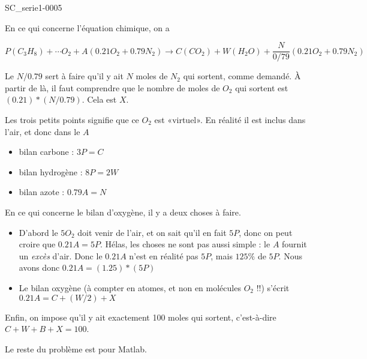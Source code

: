 \begin{corrige}{SC_serie1-0005}

	En ce qui concerne l'équation chimique, on a

	\begin{equation}
		P(C_3H_8) + \cdots O_2 + A(0.21 O_2 + 0.79 N_2) \to C (CO_2) + W(H_2O) + \frac{ N }{ 0/79 } (0.21 O_2 + 0.79 N_2)
	\end{equation}

Le $N/0.79$ sert à faire qu'il y ait $N$ moles de $N_2$ qui sortent, comme demandé. À partir de là, il faut comprendre que le nombre de moles de $O_2$ qui sortent est $(0.21)*(N/0.79)$. Cela est $X$.

 Les trois petits points signifie que ce $O_2$ est «virtuel». En réalité il est inclus dans l'air, et donc dans le $A$

\begin{itemize}
	\item 
bilan carbone : $3P = C$
\item
 bilan hydrogène : $8P = 2W$
 \item
 bilan azote : $0.79 A = N$
\end{itemize}

En ce qui concerne le bilan d'oxygène, il y a deux choses à faire.
\begin{itemize}
	\item  D'abord le $5O_2$ doit venir de l'air, et on sait qu'il en fait $5P$, donc on peut croire que $0.21A = 5P$. Hélas, les choses ne sont pas aussi simple : le $A$ fournit un \emph{excès} d'air. Donc le $0.21A$ n'est en réalité pas $5P$, mais $125\%$ de $5P$. Nous avons donc $0.21A = (1.25)*(5P)$
	\item Le bilan oxygène (à compter en atomes, et non en molécules $O_2$ !!) s'écrit $0.21 A = C+(W/2)+X$
\end{itemize}
Enfin, on impose qu'il y ait exactement 100 moles qui sortent, c'est-à-dire $C+W+B+X=100$.

Le reste du problème est pour Matlab.



\end{corrige}
